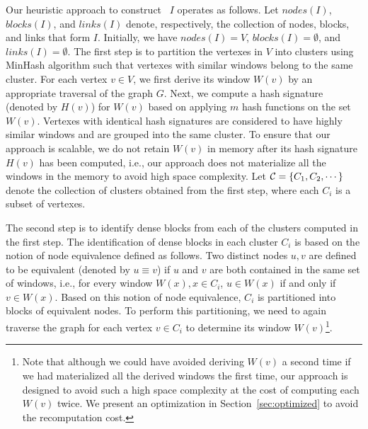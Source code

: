 Our heuristic approach to construct \DBIndex\ $I$ operates as follows.
Let $nodes(I)$, $blocks(I)$, and $links(I)$ denote, respectively,
the collection of nodes, blocks, and links that form $I$.
Initially, we have $nodes(I) = V$,
$blocks(I) = \emptyset$,
and
$links(I) = \emptyset$.
%
The first step is to partition the vertexes in $V$ into clusters
using MinHash algorithm such that vertexes with similar windows belong to the same cluster. 
For each vertex $v \in V$, we first derive its window $W(v)$ by an appropriate traversal of the graph $G$.
Next, we compute a hash signature (denoted by $H(v)$) for $W(v)$ based on applying $m$ 
hash functions on the set $W(v)$.
Vertexes with identical hash signatures are considered 
to have highly similar windows and are grouped into the same cluster.
To ensure that our approach is scalable,
we do not retain $W(v)$ in memory after its hash signature $H(v)$ has been computed,
i.e., our approach does not materialize all the windows in the memory to avoid high space complexity.
Let ${\cal C} = \{C_1,C_2,\cdots\}$ denote the collection of clusters obtained from the first step,
where each $C_i$ is a subset of vertexes.

The second step is to identify dense blocks from each of the clusters computed in the first step.
The identification of dense blocks in each cluster $C_i$ is based on the notion of node equivalence defined as follows.
Two distinct nodes $u, v$ are defined to be equivalent (denoted by $u \equiv v$)
if $u$ and $v$ are both contained in the same set of windows,
i.e., for every window $W(x), x \in C_i$, $u \in W(x)$ if and only if $v \in W(x)$.
Based on this notion of node equivalence, $C_i$ is partitioned into blocks of equivalent nodes.
To perform this partitioning, we need to again traverse the graph for each vertex $v \in C_i$ to 
determine its window $W(v)$\footnote{
Note that although we could have avoided deriving $W(v)$ a second time if we had materialized all the derived windows the first time, our approach is designed to avoid such a high space complexity at the cost of computing each $W(v)$ twice. We present an optimization in Section~\ref{sec:optimized} to avoid the recomputation cost.
}.

